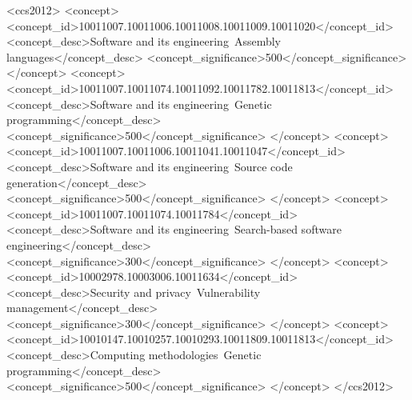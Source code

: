 \documentclass[dvipsnames, format=sigconf]{acmart}
\begin{document}
\begin{CCSXML}
<ccs2012>
   <concept>
       <concept_id>10011007.10011006.10011008.10011009.10011020</concept_id>
       <concept_desc>Software and its engineering~Assembly languages</concept_desc>
       <concept_significance>500</concept_significance>
       </concept>
   <concept>
       <concept_id>10011007.10011074.10011092.10011782.10011813</concept_id>
       <concept_desc>Software and its engineering~Genetic programming</concept_desc>
       <concept_significance>500</concept_significance>
       </concept>
   <concept>
       <concept_id>10011007.10011006.10011041.10011047</concept_id>
       <concept_desc>Software and its engineering~Source code generation</concept_desc>
       <concept_significance>500</concept_significance>
       </concept>
   <concept>
       <concept_id>10011007.10011074.10011784</concept_id>
       <concept_desc>Software and its engineering~Search-based software engineering</concept_desc>
       <concept_significance>300</concept_significance>
       </concept>
   <concept>
       <concept_id>10002978.10003006.10011634</concept_id>
       <concept_desc>Security and privacy~Vulnerability management</concept_desc>
       <concept_significance>300</concept_significance>
       </concept>
   <concept>
       <concept_id>10010147.10010257.10010293.10011809.10011813</concept_id>
       <concept_desc>Computing methodologies~Genetic programming</concept_desc>
       <concept_significance>500</concept_significance>
       </concept>
 </ccs2012>
\end{CCSXML}



\end{document}
